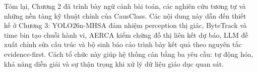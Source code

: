 Tóm lại, Chương 2 đã trình bày ngữ cảnh bài toán, các nghiên cứu tương tự và những nền tảng kỹ thuật chính của CausClass. Các nội dung này dẫn đến thiết kế ở Chương 3: YOLO26n-MHSA đảm nhiệm perception thị giác, ByteTrack và time bin tạo chuỗi hành vi, AERCA kiểm chứng đồ thị liên kết dự báo, LLM đề xuất chỉnh sửa cấu trúc và bộ sinh báo cáo trình bày kết quả theo nguyên tắc evidence-first. Cách tổ chức này giúp hệ thống cân bằng ba yêu cầu: tự động hóa, khả năng diễn giải và sự thận trọng khi xử lý dữ liệu giáo dục quan sát.